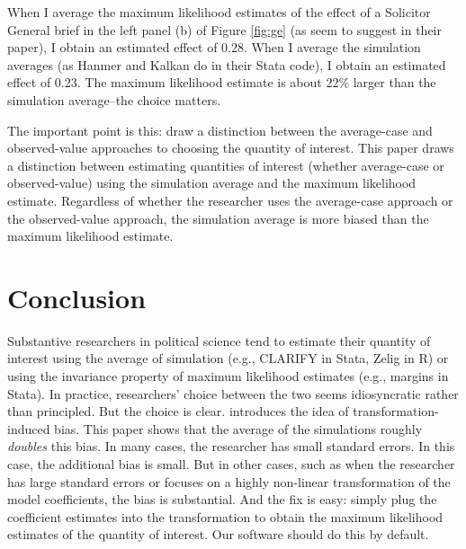 \documentclass[10pt]{article}
\begin{document}
When I average the maximum likelihood estimates of the effect of a Solicitor General brief in the left panel (b) of Figure \ref{fig:ge} (as \cite{HanmerKalkan2013} seem to suggest in their paper), I obtain an estimated effect of 0.28. When I average the simulation averages (as Hanmer and Kalkan do in their Stata code), I obtain an estimated effect of 0.23. The maximum likelihood estimate is about 22\% larger than the simulation average--the choice matters.

The important point is this: \cite{HanmerKalkan2013} draw a distinction between the average-case and observed-value approaches to choosing the quantity of interest. This paper draws a distinction between estimating quantities of interest (whether average-case or observed-value) using the simulation average and the maximum likelihood estimate. Regardless of whether the researcher uses the average-case approach or the observed-value approach, the simulation average is more biased than the maximum likelihood estimate.

\section*{Conclusion}

Substantive researchers in political science tend to estimate their quantity of interest using the average of simulation (e.g., CLARIFY in Stata, Zelig in R) or using the invariance property of maximum likelihood estimates (e.g., margins in Stata). 
In practice, researchers' choice between the two seems idiosyncratic rather than principled. 
But the choice is clear. 
\cite{Rainey2017} introduces the idea of transformation-induced bias. 
This paper shows that the average of the simulations roughly \textit{doubles} this bias.
In many cases, the researcher has small standard errors. 
In this case, the additional bias is small. 
But in other cases, such as when the researcher has large standard errors or focuses on a highly non-linear transformation of the model coefficients, the bias is substantial. 
And the fix is easy: simply plug the coefficient estimates into the transformation to obtain the maximum likelihood estimates of the quantity of interest. 
Our software should do this by default. 


\singlespace 
\small


\end{document}
